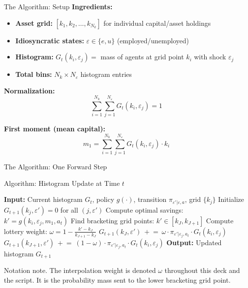 \documentclass[aspectratio=169,11pt]{beamer}
\newcommand{\emphc}[1]{\textcolor{harvardcrimson}{#1}}
\begin{document}
\begin{frame}{The Algorithm: Setup}
\textbf{Ingredients:}
\begin{itemize}
    \item \textbf{Asset grid:} $[k_1, k_2, \ldots, k_{N_k}]$ for individual capital/asset holdings
    \item \textbf{Idiosyncratic states:} $\varepsilon \in \{e, u\}$ (employed/unemployed)
    \item \textbf{Histogram:} $G_t(k_i, \varepsilon_j) =$ mass of agents at grid point $k_i$ with shock $\varepsilon_j$
    \item \textbf{Total bins:} $N_k \times N_\varepsilon$ histogram entries
\end{itemize}

\vspace{0.5em}
\textbf{Normalization:}
\[
\sum_{i=1}^{N_k} \sum_{j=1}^{N_\varepsilon} G_t(k_i, \varepsilon_j) = 1
\]

\vspace{0.3em}
\textbf{First moment (mean capital):}
\[
m_1 = \sum_{i=1}^{N_k} \sum_{j=1}^{N_\varepsilon} G_t(k_i, \varepsilon_j) \cdot k_i
\]
\end{frame}

\begin{frame}{The Algorithm: One Forward Step}
\begin{block}{Algorithm: Histogram Update at Time $t$}
\begin{algorithmic}
\footnotesize
\STATE \textbf{Input:} Current histogram $G_t$, policy $g(\cdot)$, transition $\pi_{\varepsilon'|\varepsilon,a}$, grid $\{k_j\}$
\STATE Initialize $G_{t+1}(k_j, \varepsilon') = 0$ for all $(j, \varepsilon')$
    \STATE Compute optimal savings: $k' = g(k_i, \varepsilon_j, m_1, a_t)$
    \STATE Find bracketing grid points: $k' \in [k_J, k_{J+1}]$
    \STATE Compute lottery weight: $\omega = 1 - \frac{k' - k_J}{k_{J+1} - k_J}$
        \STATE $G_{t+1}(k_J, \varepsilon') ~\mathrel{+}=~ \omega \cdot \pi_{\varepsilon'|\varepsilon_j, a_t} \cdot G_t(k_i, \varepsilon_j)$
        \STATE $G_{t+1}(k_{J+1}, \varepsilon') ~\mathrel{+}=~ (1\!-\!\omega) \cdot \pi_{\varepsilon'|\varepsilon_j, a_t} \cdot G_t(k_i, \varepsilon_j)$
    \ENDFOR
\ENDFOR
\STATE \textbf{Output:} Updated histogram $G_{t+1}$
\end{algorithmic}
\end{block}

\vspace{-0.3em}
{\scriptsize \emphc{Notation note.}  The interpolation weight is denoted $\omega$ throughout this deck and the script.  It is the probability mass sent to the lower bracketing grid point.}
\end{frame}
\end{document}
